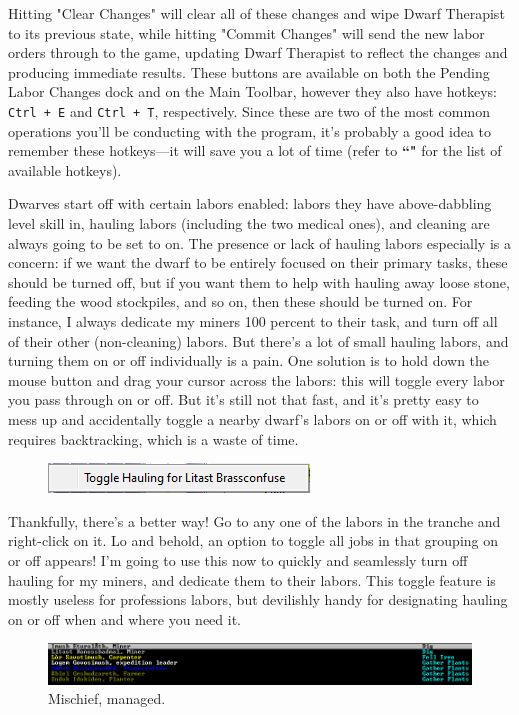 \documentclass[]{article}
\begin{document}
\newpage
\noindent Hitting "Clear Changes" will clear all of these changes and wipe Dwarf Therapist to its
previous state, while hitting "Commit Changes" will send the new labor orders through to the game,
updating Dwarf Therapist to reflect the changes and producing immediate results. These buttons are
available on both the Pending Labor Changes dock and on the Main Toolbar, however they also have hotkeys:
\texttt{Ctrl + E} and \texttt{Ctrl + T}, respectively. Since these are two of the most common operations
you'll be conducting with the program, it's probably a good idea to remember these hotkeys---it will save
you a lot of time (refer to \textbf{``"} for the list of available hotkeys).

Dwarves start off with certain labors enabled: labors they have above-dabbling level skill in, hauling
labors (including the two medical ones), and cleaning are always going to be set to on. The presence or
lack of hauling labors especially is a concern: if we want the dwarf to be entirely focused on their
primary tasks, these should be turned off, but if you want them to help with hauling away loose stone,
feeding the wood stockpiles, and so on, then these should be turned on. For instance, I always dedicate
my miners 100 percent to their task, and turn off all of their other (non-cleaning) labors. But there's a
lot of small hauling labors, and turning them on or off individually is a pain.  One solution is to hold
down the mouse button and drag your cursor across the labors: this will toggle every labor you pass
through on or off. But it's still not that fast, and it's pretty easy to mess up and accidentally toggle
a nearby dwarf's labors on or off with it, which requires backtracking, which is a waste of time.

\begin{figure}
\vspace{-20pt}
  \begin{center}
    \includegraphics{Sec2Fig4}
  \end{center}
\vspace{-10pt}
\end{figure}
Thankfully, there's a better way! Go to any one of the labors in the tranche and right-click on it. Lo
and behold, an option to toggle all jobs in that grouping on or off appears! I'm going to use this now to
quickly and seamlessly turn off hauling for my miners, and dedicate them to their labors. This toggle
feature is mostly useless for professions labors, but devilishly handy for designating hauling on or off
when and where you need it.
\begin{figure}[h!] \centering \includegraphics[width=\linewidth]{Sec2Fig5}
\caption{Mischief, managed.}
\end{figure}
\end{document}
